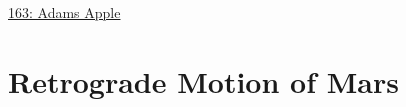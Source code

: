 \documentclass{ximera}
\begin{document}
\begin{onlineOnly}
    \begin{center}
\end{center}
\end{onlineOnly}

\href{https://www.desmos.com/calculator/xvfucsguj9}{163: Adams Apple}



\section{Retrograde Motion of Mars}

\begin{center}
\end{center}
\end{document}
